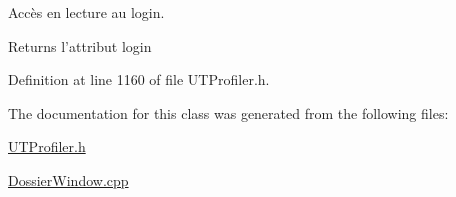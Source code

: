 Accès en lecture au login. 

\begin{DoxyReturn}{Returns}
l'attribut login 
\end{DoxyReturn}


Definition at line 1160 of file U\-T\-Profiler.\-h.



The documentation for this class was generated from the following files\-:\begin{DoxyCompactItemize}
\item 
\hyperlink{_u_t_profiler_8h}{U\-T\-Profiler.\-h}\item 
\hyperlink{_dossier_window_8cpp}{Dossier\-Window.\-cpp}\end{DoxyCompactItemize}
